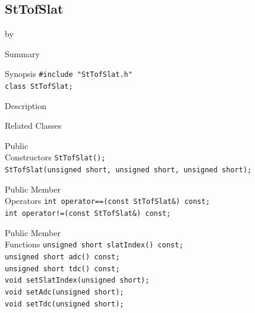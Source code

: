 \documentclass[twoside]{article}
\newcommand{\entrylabel}[1]{\mbox{\textbf{{#1}}}\hfil}%
\newenvironment{entry}
{\begin{list}{}%
    {\renewcommand{\makelabel}{\entrylabel}%
     \setlength{\labelwidth}{90pt}%
     \setlength{\leftmargin}{\labelwidth}
     \advance\leftmargin by \labelsep%
      }%
    }%
  {\end{list}}
\newcommand{\Entrylabel}[1]%
{\raisebox{0pt}[1ex][0pt]{\makebox[\labelwidth][l]%
    {\parbox[t]{\labelwidth}{\hspace{0pt}\textbf{{#1}}}}}}
\newenvironment{Entry}%
{\renewcommand{\entrylabel}{\Entrylabel}\begin{entry}}%
  {\end{entry}}
\begin{document}
\subsection{StTofSlat}
\label{sec:StTofSlat}
\begin{Entry}
\item[Summary]
\item[Synopsis]
    \verb+#include "StTofSlat.h"+\\
    \verb+class StTofSlat;+\\
\item[Description]
\item[Related Classes]
\item[Public\\ Constructors]
    \verb+StTofSlat();+\\
    \verb+StTofSlat(unsigned short, unsigned short, unsigned short);+\\
\item[Public Member\\ Operators]
    \verb+int operator==(const StTofSlat&) const;+\\
    \verb+int operator!=(const StTofSlat&) const;+\\
\item[Public Member\\ Functions]
    \verb+unsigned short slatIndex() const;+\\
    \verb+unsigned short adc() const;+\\
    \verb+unsigned short tdc() const;+\\
    \verb+void setSlatIndex(unsigned short);+\\
    \verb+void setAdc(unsigned short);+\\
    \verb+void setTdc(unsigned short);+\\
\end{Entry}
\clearpage
\end{document}
